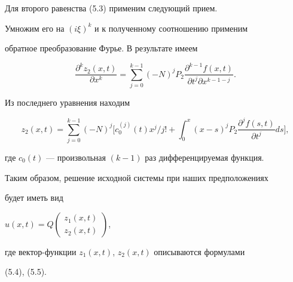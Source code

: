 Для второго равенства (5.3) применим следующий прием.


Умножим его на $(i\xi)^k$ и к полученному соотношению применим


обратное преобразование Фурье. В результате имеем


$$


\frac{\partial^k{z_2}(x,t)}{\partial{x}^k}=\sum\limits_{j=0}^{k-1}(-N)^j


P_2\frac{\partial^{k-1}f(x,t)}{\partial{t}^j\partial{x}^{k-1-j}}.


$$


Из последнего уравнения находим


\begin{equation}


z_{2}(x,t)=\sum \limits_{j=0}^{k-1}


(-N)^{j}\bigg[c_0^{(j)}(t)x^{j}/j!+\int_{0}^x


(x-s)^jP_2\frac{\partial ^jf(s,t)}{\partial t^j}ds\bigg],


\end{equation}


где $c_0(t)$ --- произвольная $(k-1)$ раз дифференцируемая функция.





Таким образом, решение исходной системы при наших предположениях


будет иметь вид


$u(x,t)=Q\left(\begin{smallmatrix}z_1(x,t) \\ z_2(x,t)\end{smallmatrix}\right)$,


где вектор-функции $z_1(x,t)$, $z_2(x,t)$ описываются формулами 


(5.4), (5.5).








